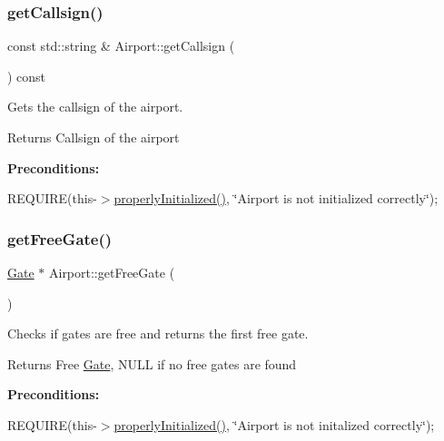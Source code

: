 \subsubsection{\texorpdfstring{get\+Callsign()}{getCallsign()}}
{\footnotesize\ttfamily const std\+::string \& Airport\+::get\+Callsign (\begin{DoxyParamCaption}{ }\end{DoxyParamCaption}) const}



Gets the callsign of the airport. 

\begin{DoxyReturn}{Returns}
Callsign of the airport
\end{DoxyReturn}
{\bfseries Preconditions\+:}
\begin{DoxyItemize}
\item R\+E\+Q\+U\+I\+RE(this-\/$>$\mbox{\hyperlink{class_airport_aa13e68ac58e8875837fbe888325cfff6}{properly\+Initialized()}}, \char`\"{}\+Airport is not initialized correctly\char`\"{}); 
\end{DoxyItemize}\mbox{\label{class_airport_a6bcdea90491d54be7f41c624006dec2c}} 
\subsubsection{\texorpdfstring{get\+Free\+Gate()}{getFreeGate()}}
{\footnotesize\ttfamily \mbox{\hyperlink{class_gate}{Gate}} $\ast$ Airport\+::get\+Free\+Gate (\begin{DoxyParamCaption}{ }\end{DoxyParamCaption})}



Checks if gates are free and returns the first free gate. 

\begin{DoxyReturn}{Returns}
Free \mbox{\hyperlink{class_gate}{Gate}}, N\+U\+LL if no free gates are found
\end{DoxyReturn}
{\bfseries Preconditions\+:}
\begin{DoxyItemize}
\item R\+E\+Q\+U\+I\+RE(this-\/$>$\mbox{\hyperlink{class_airport_aa13e68ac58e8875837fbe888325cfff6}{properly\+Initialized()}}, \char`\"{}\+Airport is not initalized correctly\char`\"{}); 
\end{DoxyItemize}\mbox{\label{class_airport_a06570bd57b66959e22ec2fdbf24d3a36}} 
